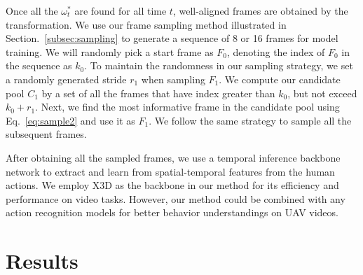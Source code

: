 \documentclass[10pt,twocolumn,letterpaper]{article}
\begin{document}
{Once all the $\omega_t^*$ are found for all time $t$,  well-aligned frames are obtained by the transformation. We use our frame sampling method illustrated in Section.~\ref{subsec:sampling} to generate a sequence of 8 or 16 frames for model training. We will randomly pick a start frame as $F_0$, denoting the index of $F_0$ in the sequence as $k_0$. To maintain the randomness in our sampling strategy, we set a randomly generated stride $r_1$ when sampling $F_1$. We compute our candidate pool $C_1$ by a set of all the frames that have index greater than $k_0$, but not exceed $k_0 + r_1$. Next, we find the most informative frame in the candidate pool using Eq.~\ref{eq:sample2} and use it as $F_1$. We follow the same strategy to sample all the subsequent frames.

After obtaining all the sampled frames, we use a temporal inference backbone network to extract and learn from spatial-temporal features from the human actions. We employ X3D\cite{feichtenhofer2020x3d} as the backbone in our method for its efficiency and performance on video tasks. However, our method could be combined with any action recognition models for better behavior understandings on UAV videos.


\label{sec:method}

 \section{Results}
\label{sec:results}

\begin{table}
\centering
{}
\vspace{-7pt}
\caption{Results on Drone Action. Our method achieves 100\% top-1 accuracy, 16.6\% over the baseline method X3D-M\cite{feichtenhofer2020x3d}, outperforming current state-of-the-art method FAR\cite{divya2022far} by 7.3\% under same configuration. (HLPF \cite{jhuang2013towards}, PCNN \cite{cheron2015p})}
\vspace{-5pt}
\label{tab:droneaction}
\end{table}

}
\end{document}
